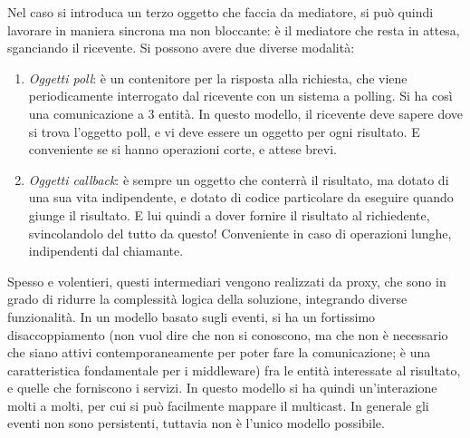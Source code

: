 Nel caso si introduca un terzo oggetto che faccia da mediatore, si può quindi lavorare in maniera sincrona ma non
bloccante: è il mediatore che resta in attesa, sganciando il ricevente. Si possono avere due diverse modalità:
\begin{enumerate}
 \item \textit{Oggetti poll}: è un contenitore per la risposta alla richiesta, che viene periodicamente interrogato
 dal ricevente con un sistema a polling. Si ha così una comunicazione a 3 entità. In questo modello, il ricevente
 deve sapere dove si trova l'oggetto poll, e vi deve essere un oggetto per ogni risultato. E conveniente se si hanno
 operazioni corte, e attese brevi.
 \item \textit{Oggetti callback}: è sempre un oggetto che conterrà il risultato, ma dotato di una sua vita
 indipendente, e dotato di codice particolare da eseguire quando giunge il risultato. E lui quindi a dover fornire il
 risultato al richiedente, svincolandolo del tutto da questo! Conveniente in caso di operazioni lunghe, indipendenti
 dal chiamante.
\end{enumerate}
Spesso e volentieri, questi intermediari vengono realizzati da proxy, che sono in grado di ridurre la complessità
logica della soluzione, integrando diverse funzionalità.
In un modello basato sugli eventi, si ha un fortissimo disaccoppiamento (non vuol dire che non si conoscono, ma che
non è necessario che siano attivi contemporaneamente per poter fare la comunicazione; è una caratteristica
fondamentale per i middleware) fra le entità interessate al risultato, e quelle che forniscono i servizi. In questo
modello si ha quindi un'interazione molti a molti, per cui si può facilmente mappare il multicast. In generale gli
eventi non sono persistenti, tuttavia non è l'unico modello possibile.
